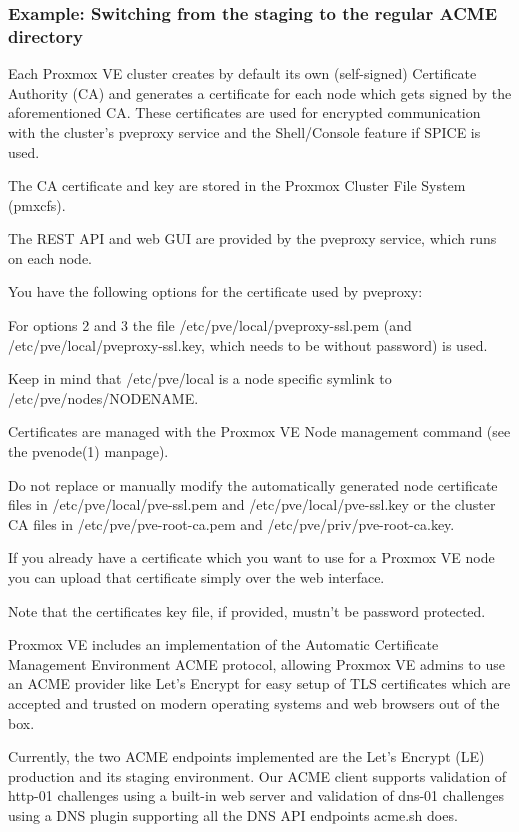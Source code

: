 \subsubsection{Example: Switching from the staging to the regular ACME directory}

Each Proxmox VE cluster creates by default its own (self-signed) Certificate Authority (CA) and generates a certificate for each node which gets signed by the aforementioned CA. These certificates are used for encrypted communication with the cluster’s pveproxy service and the Shell/Console feature if SPICE is used.

The CA certificate and key are stored in the Proxmox Cluster File System (pmxcfs).

The REST API and web GUI are provided by the pveproxy service, which runs on each node.

You have the following options for the certificate used by pveproxy:

For options 2 and 3 the file /etc/pve/local/pveproxy-ssl.pem (and /etc/pve/local/pveproxy-ssl.key, which needs to be without password) is used.

Keep in mind that /etc/pve/local is a node specific symlink to /etc/pve/nodes/NODENAME.

Certificates are managed with the Proxmox VE Node management command (see the pvenode(1) manpage).

Do not replace or manually modify the automatically generated node certificate files in /etc/pve/local/pve-ssl.pem and /etc/pve/local/pve-ssl.key or the cluster CA files in /etc/pve/pve-root-ca.pem and /etc/pve/priv/pve-root-ca.key.

If you already have a certificate which you want to use for a Proxmox VE node you can upload that certificate simply over the web interface.

Note that the certificates key file, if provided, mustn’t be password protected.

Proxmox VE includes an implementation of the Automatic Certificate Management Environment ACME protocol, allowing Proxmox VE admins to use an ACME provider like Let’s Encrypt for easy setup of TLS certificates which are accepted and trusted on modern operating systems and web browsers out of the box.

Currently, the two ACME endpoints implemented are the Let’s Encrypt (LE) production and its staging environment. Our ACME client supports validation of http-01 challenges using a built-in web server and validation of dns-01 challenges using a DNS plugin supporting all the DNS API endpoints acme.sh does.

